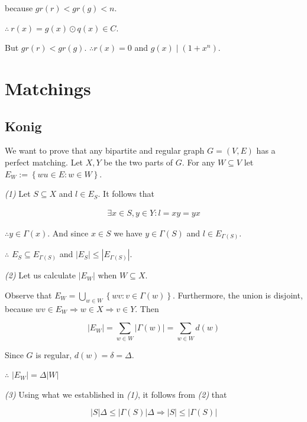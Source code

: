 \documentclass[a4paper, 12pt]{article}
\begin{document}
because $gr(r) < gr(g) < n$.

$\therefore ~ r(x) = g(x) \odot  q(x) \in C$.

But $gr(r) < gr(g)$. $\therefore  r(x) = 0$ and $g(x) \mid (1 + x^n)$.



\pagebreak

\section{Matchings}

\subsection{Konig}

We want to prove that any bipartite and regular graph $G = (V, E) $ has a
perfect matching. Let $X, Y$ be the two parts of $G$. For any $W \subseteq V$
let $E_W := \left\{ wu \in E : w \in W \right\} $.

\textit{(1)} Let $S \subseteq X$ and $l \in E_S$. It follows that

\begin{align*}
    \exists x \in S, y \in Y : l = xy = yx 
\end{align*}

$\therefore y \in \Gamma(x)$. And since $x \in  S$ we have $y \in \Gamma(S)$ 
and $l \in E_{\Gamma(S)}$.

$\therefore $ $E_S \subseteq E_{\Gamma(S)}$ and $|E_S| \leq |E_{\Gamma(S)}|$.

\textit{(2)} Let us calculate $|E_W|$ when $W \subseteq X$.

Observe that $E_W = \bigcup_{w \in W} \left\{ wv : v \in \Gamma(w) \right\} $.
Furthermore, the union is disjoint, because $wv \in E_W \Rightarrow w \in X
\Rightarrow v \in Y$. Then

\begin{equation*}
    |E_W| = \sum_{w \in W} |\Gamma(w)| = \sum_{w \in W} d(w)
\end{equation*}

Since $G$ is regular, $d(w) = \delta = \Delta$. 

$\therefore $ $|E_W| = \Delta |W|$

\textit{(3)} Using what we established in \textit{(1)}, it follows from \textit{(2)} that

\begin{equation*}
    |S| \Delta \leq |\Gamma(S)| \Delta \Rightarrow |S| \leq |\Gamma(S)| 
\end{equation*}
\end{document}
